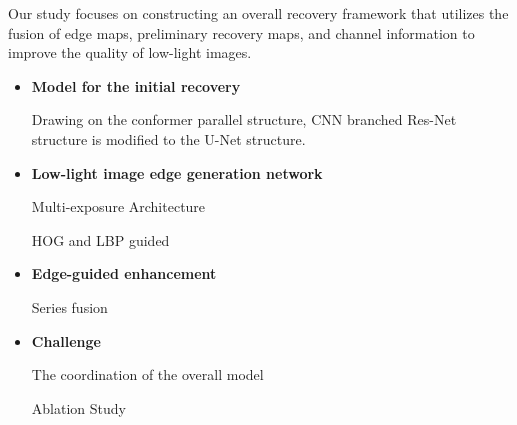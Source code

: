 \documentclass[CJK,aspectratio=169]{beamer}  %
\begin{document}
	\begin{frame}
		
		Our study focuses on constructing an overall recovery framework that utilizes the fusion of edge maps, preliminary recovery maps, and channel information to improve the quality of low-light images.
		
		
		\begin{itemize} 
			\item \textbf{Model for the initial recovery }
			
			\small Drawing on the conformer parallel structure, CNN branched Res-Net structure is modified to the U-Net structure.

			\item \textbf{Low-light image edge generation network}
			
			\small Multi-exposure Architecture
			
			\small HOG and LBP guided
			
			
			\item \textbf{Edge-guided enhancement}
			
			\small Series fusion
			
			\item \textbf{Challenge}
			
			\small The coordination of the overall model
			
			\small Ablation Study
			
			
		\end{itemize}
		
	\end{frame}
	
\end{document}

